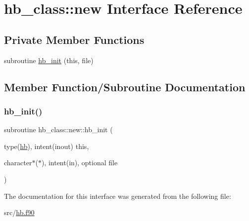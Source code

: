 \hypertarget{interfacehb__class_1_1new}{}\section{hb\+\_\+class\+:\+:new Interface Reference}
\label{interfacehb__class_1_1new}
\subsection*{Private Member Functions}
\begin{DoxyCompactItemize}
\item 
subroutine \hyperlink{interfacehb__class_1_1new_a6957e15d78d88a59df5e4aaeb8ba2be8}{hb\+\_\+init} (this, file)
\end{DoxyCompactItemize}


\subsection{Member Function/\+Subroutine Documentation}
\mbox{\label{interfacehb__class_1_1new_a6957e15d78d88a59df5e4aaeb8ba2be8}} 
\subsubsection{\texorpdfstring{hb\+\_\+init()}{hb\_init()}}
{\footnotesize\ttfamily subroutine hb\+\_\+class\+::new\+::hb\+\_\+init (\begin{DoxyParamCaption}\item[{type(\hyperlink{structhb__class_1_1hb}{hb}), intent(inout)}]{this,  }\item[{character$\ast$($\ast$), intent(in), optional}]{file }\end{DoxyParamCaption})\hspace{0.3cm}{\ttfamily [private]}}



The documentation for this interface was generated from the following file\+:\begin{DoxyCompactItemize}
\item 
src/\hyperlink{hb_8f90}{hb.\+f90}\end{DoxyCompactItemize}
